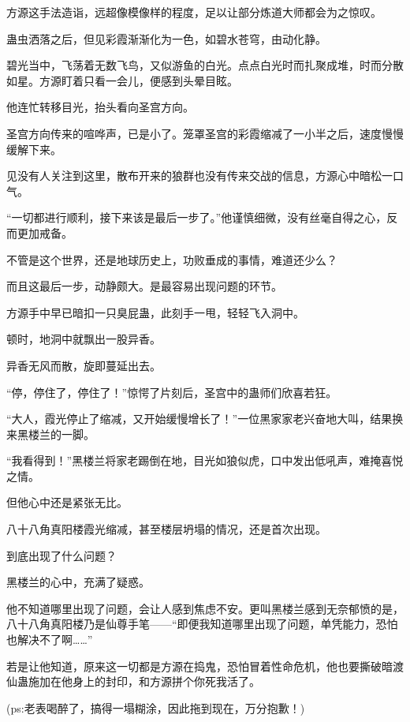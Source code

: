 \begin{this_body}
方源这手法造诣，远超像模像样的程度，足以让部分炼道大师都会为之惊叹。

蛊虫洒落之后，但见彩霞渐渐化为一色，如碧水苍穹，由动化静。

碧光当中，飞荡着无数飞鸟，又似游鱼的白光。点点白光时而扎聚成堆，时而分散如星。方源盯着只看一会儿，便感到头晕目眩。

他连忙转移目光，抬头看向圣宫方向。

圣宫方向传来的喧哗声，已是小了。笼罩圣宫的彩霞缩减了一小半之后，速度慢慢缓解下来。

见没有人关注到这里，散布开来的狼群也没有传来交战的信息，方源心中暗松一口气。

“一切都进行顺利，接下来该是最后一步了。”他谨慎细微，没有丝毫自得之心，反而更加戒备。

不管是这个世界，还是地球历史上，功败垂成的事情，难道还少么？

而且这最后一步，动静颇大。是最容易出现问题的环节。

方源手中早已暗扣一只臭屁蛊，此刻手一甩，轻轻飞入洞中。

顿时，地洞中就飘出一股异香。

异香无风而散，旋即蔓延出去。

“停，停住了，停住了！”惊愕了片刻后，圣宫中的蛊师们欣喜若狂。

“大人，霞光停止了缩减，又开始缓慢增长了！”一位黑家家老兴奋地大叫，结果换来黑楼兰的一脚。

“我看得到！”黑楼兰将家老踢倒在地，目光如狼似虎，口中发出低吼声，难掩喜悦之情。

但他心中还是紧张无比。

八十八角真阳楼霞光缩减，甚至楼层坍塌的情况，还是首次出现。

到底出现了什么问题？

黑楼兰的心中，充满了疑惑。

他不知道哪里出现了问题，会让人感到焦虑不安。更叫黑楼兰感到无奈郁愤的是，八十八角真阳楼乃是仙尊手笔——“即便我知道哪里出现了问题，单凭能力，恐怕也解决不了啊……”

若是让他知道，原来这一切都是方源在捣鬼，恐怕冒着性命危机，他也要撕破暗渡仙蛊施加在他身上的封印，和方源拼个你死我活了。

(ps:老表喝醉了，搞得一塌糊涂，因此拖到现在，万分抱歉！)

\end{this_body}

